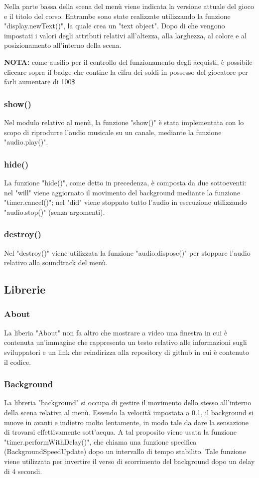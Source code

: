 \documentclass[12pt]{article}
\begin{document}
Nella parte bassa della scena del menù viene indicata la versione attuale del gioco e il titolo del corso. Entrambe sono state realizzate utilizzando la funzione "display.newText()", la quale crea un "text object". Dopo di che vengono impostati i valori degli attributi relativi all'altezza, alla larghezza, al colore e al posizionamento all'interno della scena. 

\textbf{NOTA:} come ausilio per il controllo del funzionamento degli acquisti, è possibile cliccare sopra il badge che contine la cifra dei soldi in possesso del giocatore per farli aumentare di 100\$ 

\subsubsection{show()}
Nel modulo relativo al menù, la funzione "show()" è stata implementata con lo scopo di riprodurre l'audio musicale su un canale, mediante la funzione "audio.play()".

\subsubsection{hide()}
La funzione "hide()", come detto in precedenza, è composta da due sottoeventi: nel "will" viene aggiornato il movimento del background mediante la funzione "timer.cancel()"; nel "did" viene stoppato tutto l'audio in esecuzione utilizzando "audio.stop()" (senza argomenti).

\subsubsection{destroy()}
Nel "destroy()" viene utilizzata la funzione "audio.dispose()" per stoppare l'audio relativo alla soundtrack del menù. 

\subsection{Librerie}
\subsubsection{About}
La liberia "About" non fa altro che mostrare a video una finestra in cui è contenuta un'immagine che rappresenta un testo relativo alle informazioni sugli sviluppatori e un link che reindirizza alla repository di github in cui è contenuto il codice. 

\subsubsection{Background}
La libreria "background" si occupa di gestire il movimento dello stesso all'interno della scena relativa al menù. Essendo la velocità impostata a 0.1, il background si muove in avanti e indietro molto lentamente, in modo tale da dare la sensazione di trovarsi effettivamente sott'acqua. A tal proposito viene usata la funzione "timer.performWithDelay()", che chiama una funzione specifica (BackgroundSpeedUpdate) dopo un intervallo di tempo stabilito. Tale funzione viene utilizzata per invertire il verso di scorrimento del background dopo un delay di 4 secondi. 
\end{document}
